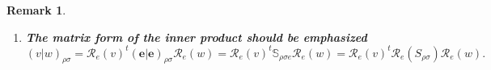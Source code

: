 \documentclass[aps,preprint]{revtex4}
\newtheorem{remark}[theorem]{Remark}
\begin{document}
\begin{remark}
\begin{enumerate}
\begin{enumerate}
\item 
\begin{equation}
\left( \left. v\right\vert w\right) _{\rho \sigma }=\left( 
\begin{array}{ccc}
\mathcal{R}_{e}\left( v\right) _{1} & \cdots & \mathcal{R}_{e}\left(
v\right) _{2r}%
\end{array}%
\right) \left[ \left( 
\begin{array}{c}
e_{1} \\ 
\vdots \\ 
e_{2r}%
\end{array}%
\right) \right] _{\rho \sigma }\left( 
\begin{array}{ccc}
e_{1} & \cdots & e_{2r}%
\end{array}%
\right) \left( 
\begin{array}{c}
\mathcal{R}_{e}\left( w\right) _{1} \\ 
\vdots \\ 
\mathcal{R}_{e}\left( w\right) _{2r}%
\end{array}%
\right) .
\end{equation}

\item 
\begin{equation}
\left( \left. v\right\vert w\right) _{\rho \sigma }=\left( 
\begin{array}{ccc}
\mathcal{R}_{e}\left( v\right) _{1} & \cdots & \mathcal{R}_{e}\left(
v\right) _{2r}%
\end{array}%
\right) \left( 
\begin{array}{ccc}
\left( \left. e_{1}\right\vert e_{1}\right) _{\rho \sigma } & \cdots & 
\left( \left. e_{1}\right\vert e_{2r}\right) _{\rho \sigma } \\ 
\vdots & \ddots & \vdots \\ 
\left( \left. e_{2r}\right\vert e_{1}\right) _{\rho \sigma } & \cdots & 
\left( \left. e_{2r}\right\vert e_{2r}\right) _{\rho \sigma }%
\end{array}%
\right) \left( 
\begin{array}{c}
\mathcal{R}_{e}\left( w\right) _{1} \\ 
\vdots \\ 
\mathcal{R}_{e}\left( w\right) _{2r}%
\end{array}%
\right) .
\end{equation}
\end{enumerate}

\item \textbf{The matrix form of the inner product should be emphasized} 
\begin{equation}
\left( \left. v\right\vert w\right) _{\rho \sigma }=\mathcal{R}_{e}\left(
v\right) ^{t}\left( \left. \mathbf{e}\right\vert \mathbf{e}\right) _{\rho
\sigma }\mathcal{R}_{e}\left( w\right) =\mathcal{R}_{e}\left( v\right) ^{t}%
\mathbb{S}_{\rho \sigma e}\mathcal{R}_{e}\left( w\right) =\mathcal{R}%
_{e}\left( v\right) ^{t}\mathcal{R}_{e}\left( S_{\rho \sigma }\right) 
\mathcal{R}_{e}\left( w\right) .
\end{equation}
\end{enumerate}
\end{remark}
\end{document}
